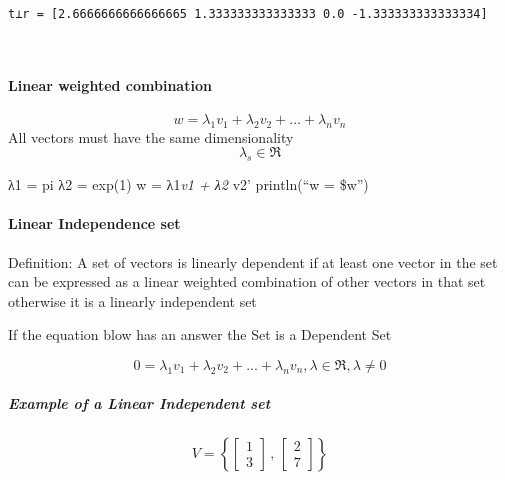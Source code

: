 \documentclass[11pt]{article}
\newcommand{\prompt}[4]{
        {\ttfamily\llap{{\color{#2}[#3]:\hspace{3pt}#4}}\vspace{-\baselineskip}}
    }
\begin{document}
\begin{tcolorbox}[breakable, size=fbox, boxrule=1pt, pad at break*=1mm,colback=cellbackground, colframe=cellborder]
\begin{Verbatim}[commandchars=\\\{\}]
\end{Verbatim}
\end{tcolorbox}

    \begin{Verbatim}[commandchars=\\\{\}]
t⟂r = [2.6666666666666665 1.333333333333333 0.0 -1.333333333333334]
    \end{Verbatim}
 
            
\prompt{Out}{outcolor}{15}{}
    
    \begin{center}
    \end{center}
    { \hspace*{\fill} \\}
    

    \paragraph{Linear weighted
combination}\label{linear-weighted-combination}

\[ w = \lambda_{1} v_{1} + \lambda_{2}v_{2} + . . . + \lambda_{n}v_{n} \]
All vectors must have the same dimensionality \[ \lambda_{s}  \in \Re \]

    λ1 = pi λ2 = exp(1) w = λ1\emph{v1 + λ2 } v2' println(``w = \$w'')

    \paragraph{Linear Independence set}\label{linear-independence-set}

Definition: A set of vectors is linearly dependent if at least one
vector in the set can be expressed as a linear weighted combination of
other vectors in that set otherwise it is a linearly independent set

If the equation blow has an answer the Set is a Dependent Set

\[
0 = \lambda_{1} v_{1} + \lambda_{2} v_{2} + . . .  + \lambda_{n} v_{n} ,  \lambda \in \Re , \lambda \ne 0
\]

    \subparagraph{Example of a Linear Independent
set}\label{example-of-a-linear-independent-set}

\[ V = \left\{ { \left[ 
\begin{matrix}
1 \\
3 
\end{matrix}
\right] \, , \, \left[\begin{matrix}
2 \\ 7 \end{matrix}\right] }\right\}\]
\end{document}
